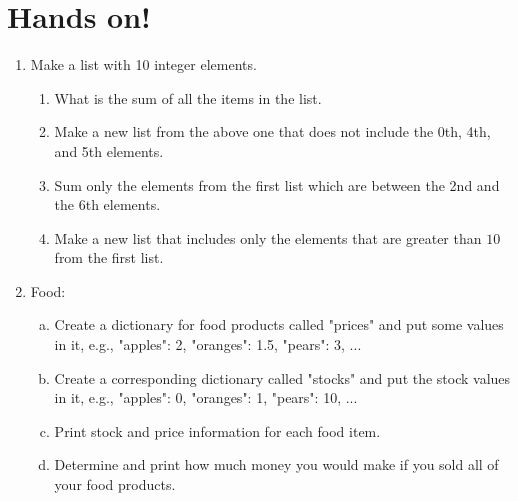 \documentclass[aspectratio=1610,slidestop]{beamer}
\begin{document}
\section{Hands on!}
\begin{pframe}
 \vspace{-0.5cm}
 \begin{enumerate}
  \item Make a list with 10 integer elements.
  \begin{enumerate}[a]
  \item What is the sum of all the items in the list.
  \item Make a new list from the above one that does not include the 0th, 4th,
  and 5th elements.
  \item Sum only the elements from the first list which are between the 2nd and
  the 6th elements.
  \item Make a new list that includes only the elements that are greater than
  $10$ from the first list.
  \end{enumerate}
  \item Food:
  \begin{enumerate}[a.]
   \item Create a dictionary for food products called "prices" and put some
   values in it, e.g., "apples": 2, "oranges": 1.5, "pears": 3, ...
   \item Create a corresponding dictionary called "stocks" and put the stock
   values in it, e.g., "apples": 0, "oranges": 1, "pears": 10, ...
   \item Print stock and price information for each food item.
   \item Determine and print how much money you would make if you sold all of
   your food products.
  \end{enumerate}
 \end{enumerate}
\end{pframe}


\end{document}
